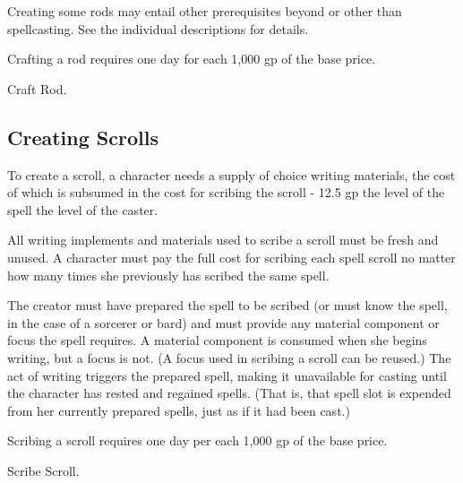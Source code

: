 Creating some rods may entail other prerequisites beyond or other than spellcasting. See the individual descriptions for details.

Crafting a rod requires one day for each 1,000 gp of the base price.

 Craft Rod.

\subsection{Creating Scrolls}

To create a scroll, a character needs a supply of choice writing materials, the cost of which is subsumed in the cost for scribing the scroll - 12.5 gp \mtimes the level of the spell \mtimes the level of the caster.

All writing implements and materials used to scribe a scroll must be fresh and unused. A character must pay the full cost for scribing each spell scroll no matter how many times she previously has scribed the same spell.

The creator must have prepared the spell to be scribed (or must know the spell, in the case of a sorcerer or bard) and must provide any material component or focus the spell requires. A material component is consumed when she begins writing, but a focus is not. (A focus used in scribing a scroll can be reused.) The act of writing triggers the prepared spell, making it unavailable for casting until the character has rested and regained spells. (That is, that spell slot is expended from her currently prepared spells, just as if it had been cast.)

Scribing a scroll requires one day per each 1,000 gp of the base price.

 Scribe Scroll.

